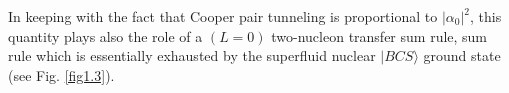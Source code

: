 
In keeping with the fact that Cooper pair tunneling is proportional to $|\alpha_0|^2$, this quantity plays also the
role of a $(L=0)$ two-nucleon
transfer sum rule, sum rule which is essentially exhausted by the superfluid nuclear $|BCS\rangle$ ground state (see Fig. \ref{fig1.3}). 
%


